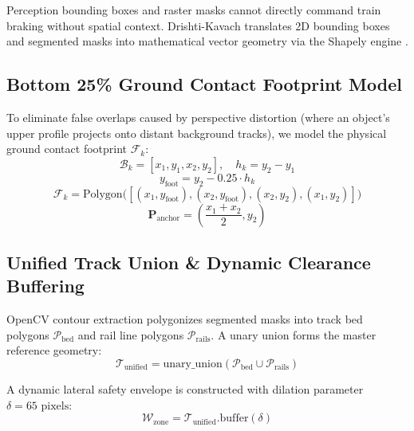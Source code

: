 \documentclass[conference]{IEEEtran}
\begin{document}
Perception bounding boxes and raster masks cannot directly command train braking without spatial context. Drishti-Kavach translates 2D bounding boxes and segmented masks into mathematical vector geometry via the Shapely engine \cite{wu2025research, liu2025railbev}.

\subsection{Bottom 25\% Ground Contact Footprint Model}
To eliminate false overlaps caused by perspective distortion (where an object's upper profile projects onto distant background tracks), we model the physical ground contact footprint $\mathcal{F}_k$:
\begin{equation}
\mathcal{B}_k = [x_1, y_1, x_2, y_2], \quad h_k = y_2 - y_1
\end{equation}
\begin{equation}
y_{\text{foot}} = y_2 - 0.25 \cdot h_k
\end{equation}
\begin{equation}
\mathcal{F}_k = \text{Polygon}\big([(x_1, y_{\text{foot}}), (x_2, y_{\text{foot}}), (x_2, y_2), (x_1, y_2)]\big)
\end{equation}
\begin{equation}
\mathbf{P}_{\text{anchor}} = \left(\frac{x_1 + x_2}{2}, y_2\right)
\end{equation}

\subsection{Unified Track Union \& Dynamic Clearance Buffering}
OpenCV contour extraction polygonizes segmented masks into track bed polygons $\mathcal{P}_{\text{bed}}$ and rail line polygons $\mathcal{P}_{\text{rails}}$. A unary union forms the master reference geometry:
\begin{equation}
\mathcal{T}_{\text{unified}} = \text{unary\_union}\left(\mathcal{P}_{\text{bed}} \cup \mathcal{P}_{\text{rails}}\right)
\end{equation}

A dynamic lateral safety envelope is constructed with dilation parameter $\delta = 65\text{ pixels}$:
\begin{equation}
\mathcal{W}_{\text{zone}} = \mathcal{T}_{\text{unified}}.\text{buffer}(\delta)
\end{equation}
\end{document}
